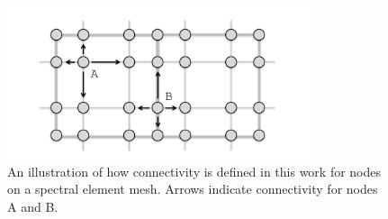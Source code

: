 \documentclass[gmdd, hvmath, online]{copernicus_discussions}
\begin{document}
\begin{figure}[H]
\begin{center}
\includegraphics[width=3.5in]{FiniteElementFeatureTracking.pdf}
\end{center}
\caption{An illustration of how connectivity is defined in this work for nodes on a spectral element mesh.  Arrows indicate connectivity for nodes A and B.} \label{fig:FiniteElementConnectivity}
\end{figure}
\end{document}
